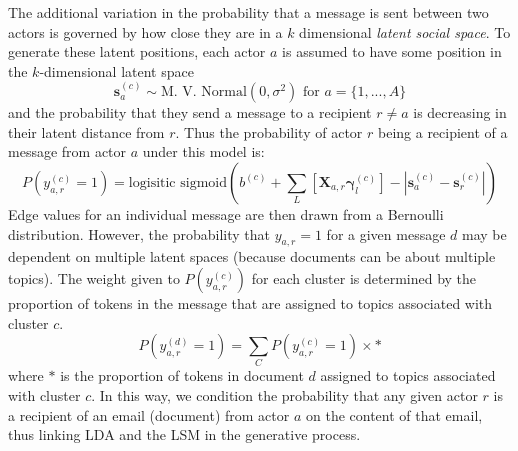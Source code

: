 \documentclass{pnastwo}
\begin{document}
\begin{article}
The additional variation in the probability that a message is sent between two actors is governed by how close they are in a $k$ dimensional \emph{latent social space}. To generate these latent positions, each actor $a$ is assumed to have some position in the $k$-dimensional latent space
\begin{equation}
	\mathbf{s}_a^{(c)} \sim \text{M. V. Normal}(0, \sigma^2) \text{ for } a = \{1, ...,A\}
\end{equation}
and the probability that they send a message to a recipient $r \neq a$ is decreasing in their latent distance from $r$. Thus the probability of actor $r$ being a recipient of a message from actor $a$ under this model is:
\begin{equation}
	P(y_{a,r}^{(c)} = 1) = \text{logisitic sigmoid}\left( b^{(c)} + \sum_L \left[\mathbf{X}_{a,r} \mathbf{\gamma}_l^{(c)}\right] - |\mathbf{s}_a^{(c)} - \mathbf{s}_r^{(c)}| \right)
\end{equation}
Edge values for an individual message are then drawn from a Bernoulli distribution. However, the probability that $y_{a,r} = 1$ for a given message $d$ may be dependent on multiple latent spaces (because documents can be about multiple topics). The weight given to $P(y_{a,r}^{(c)})$ for each cluster is determined by the proportion of tokens in the message that are assigned to topics associated with cluster $c$.  
\begin{equation}
	P(y_{a,r}^{(d)} = 1) = \sum_C P(y_{a,r}^{(c)} = 1) \times *
\end{equation}
where $*$ is the proportion of tokens in document $d$ assigned to topics associated with cluster $c$. In this way, we condition the probability that any given actor $r$ is a recipient of an email (document) from actor $a$ on the content of that email, thus linking LDA and the LSM in the generative process.


\end{article}
\end{document}
